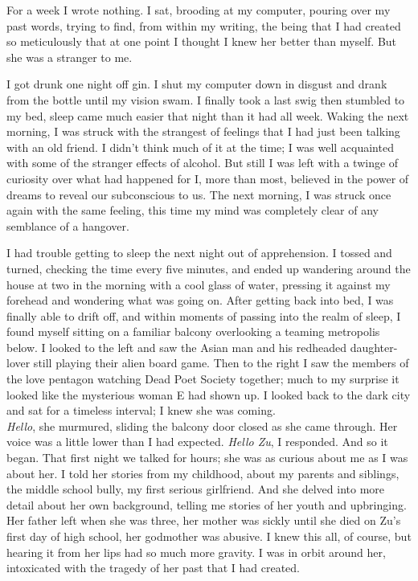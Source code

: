 \documentclass[12pt,oneside,openany]{memoir}
\begin{document}
	For a week I wrote nothing. I sat, brooding at my computer, pouring over my past words, trying to find, from within my writing, the being that I had created so meticulously that at one point I thought I knew her better than myself. But she was a stranger to me.
	
	I got drunk one night off gin. I shut my computer down in disgust and drank from the bottle until my vision swam. I finally took a last swig then stumbled to my bed, sleep came much easier that night than it had all week. Waking the next morning, I was struck with the strangest of feelings that I had just been talking with an old friend. I didn’t think much of it at the time; I was well acquainted with some of the stranger effects of alcohol. But still I was left with a twinge of curiosity over what had happened for I, more than most, believed in the power of dreams to reveal our subconscious to us. The next morning, I was struck once again with the same feeling, this time my mind was completely clear of any semblance of a hangover.
	
	I had trouble getting to sleep the next night out of apprehension. I tossed and turned, checking the time every five minutes, and ended up wandering around the house at two in the morning with a cool glass of water, pressing it against my forehead and wondering what was going on. After getting back into bed, I was finally able to drift off, and within moments of passing into the realm of sleep, I found myself sitting on a familiar balcony overlooking a teaming metropolis below. I looked to the left and saw the Asian man and his redheaded daughter-lover still playing their alien board game. Then to the right I saw the members of the love pentagon watching Dead Poet Society together; much to my surprise it looked like the mysterious woman E had shown up. I looked back to the dark city and sat for a timeless interval; I knew she was coming.
\\
\indent\textit{Hello}, she murmured, sliding the balcony door closed as she came through. Her voice was a little lower than I had expected. \textit{Hello Zu}, I responded. And so it began. That first night we talked for hours; she was as curious about me as I was about her. I told her stories from my childhood, about my parents and siblings, the middle school bully, my first serious girlfriend. And she delved into more detail about her own background, telling me stories of her youth and upbringing. Her father left when she was three, her mother was sickly until she died on Zu’s first day of high school, her godmother was abusive. I knew this all, of course, but hearing it from her lips had so much more gravity. I was in orbit around her, intoxicated with the tragedy of her past that I had created.
\end{document}
